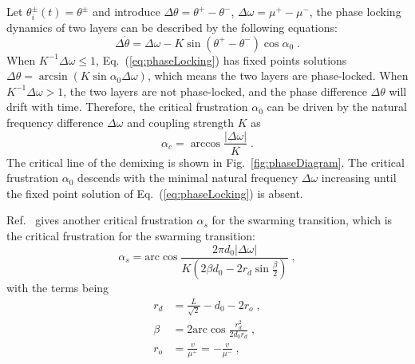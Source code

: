 \documentclass{article}
\begin{document}
Let $\theta _{i}^{\pm}\left( t \right) =\theta ^{\pm}$ and introduce $\Delta \theta=\theta^{+}-\theta^{-}$, $\Delta \omega=\mu^{+}-\mu^{-}$, the phase locking dynamics of two layers can be described by the following equations:
\begin{equation}
    \label{eq:phaseLocking}
    \Delta \dot{\theta}=\Delta \omega -K\sin \left( \theta ^+-\theta ^- \right) \cos \alpha _0\;.
\end{equation}
When $K^{-1}\Delta \omega \leqslant 1$, Eq.~(\ref{eq:phaseLocking}) has fixed points solutions $\Delta \theta =\arcsin \left( K\sin \alpha _0\Delta \omega \right)$, which means the two layers are phase-locked. 
When $K^{-1}\Delta \omega > 1$, the two layers are not phase-locked, and the phase difference $\Delta \theta$ will drift with time. Therefore, the critical frustration $\alpha _0$ can be driven by the natural frequency difference $\Delta \omega$ and coupling strength $K$ as
\begin{equation}
    \label{eq:criticalFrustration}
    \alpha _c=\arccos \frac{\left| \Delta \omega \right|}{K}\;.
\end{equation}
The critical line of the demixing is shown in Fig.~\ref{fig:phaseDiagram}. The critical frustration $\alpha _0$ descends with the minimal natural frequency $\Delta \omega$ increasing until the fixed point solution of Eq.~(\ref{eq:phaseLocking}) is absent.

Ref.~\cite{LU2025115794} gives another critical frustration $\alpha _s$ for the swarming transition, which is the critical frustration for the swarming transition:
\begin{equation}
    \label{eq:criticalFrustrationSwarming}
    \alpha _s=\mathrm{arc}\cos \frac{2\pi d_0\left| \Delta \omega \right|}{K\left( 2\beta d_0-2r_d\sin \frac{\beta}{2} \right)}\;,
\end{equation}
with the terms being
\begin{equation}
    \begin{aligned}
        r_d&=\frac{L}{\sqrt{2}}-d_0-2r_o\;,\\
        \beta &=2\mathrm{arc}\cos \frac{r_{d}^{2}}{2d_0r_d}\;,\\
        r_o&=\frac{v}{\mu ^+}=-\frac{v}{\mu ^-}\;,\\
    \end{aligned}
\end{equation}
\end{document}
